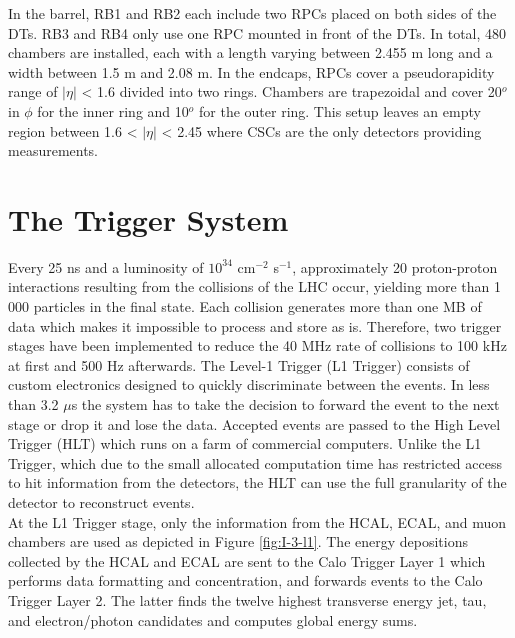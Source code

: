       In the barrel, RB1 and RB2 each include two RPCs placed on both sides of the DTs. RB3 and RB4 only use one RPC mounted in front of the DTs. In total, 480 chambers are installed, each with a length varying between 2.455 m long and a width between 1.5 m and 2.08 m. In the endcaps, RPCs cover a pseudorapidity range of $ | \eta | $ < 1.6 divided into two rings. Chambers are trapezoidal and cover 20$^o$ in $ \phi $ for the inner ring and 10$^o$ for the outer ring. This setup leaves an empty region between 1.6 < $ | \eta | $ < 2.45 where CSCs are the only detectors providing measurements.

  \section{The Trigger System}

    Every 25 ns and a luminosity of $ 10^{34} $ cm$^{-2}$ s$^{-1}$, approximately 20 proton-proton interactions resulting from the collisions of the LHC occur, yielding more than 1 000 particles in the final state. Each collision generates more than one MB of data which makes it impossible to process and store as is. Therefore, two trigger stages have been implemented to reduce the 40 MHz rate of collisions to 100 kHz at first and 500 Hz afterwards. The Level-1 Trigger (L1 Trigger) consists of custom electronics designed to quickly discriminate between the events. In less than 3.2 $\mu$s the system has to take the decision to forward the event to the next stage or drop it and lose the data. Accepted events are passed to the High Level Trigger (HLT) which runs on a farm of commercial computers. Unlike the L1 Trigger, which due to the small allocated computation time has restricted access to hit information from the detectors, the HLT can use the full granularity of the detector to reconstruct events. \\

    At the L1 Trigger stage, only the information from the HCAL, ECAL, and muon chambers are used as depicted in Figure \ref{fig:I-3-l1}. The energy depositions collected by the HCAL and ECAL are sent to the Calo Trigger Layer 1 which performs data formatting and concentration, and forwards events to the Calo Trigger Layer 2. The latter finds the twelve highest transverse energy jet, tau, and electron/photon candidates and computes global energy sums. \\

